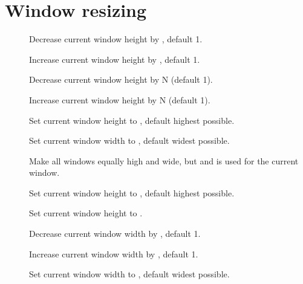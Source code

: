\section{Window resizing}
\begin{description}
  \item[] Decrease current window height by , default 1.
  \item[] Increase current window height by , default 1.
  \item[] Decrease current window height by N (default 1).
  \item[] Increase current window height by N (default 1).
  \item[] Set current window height to , default highest possible.
  \item[] Set current window width to , default widest possible.
  \item[] Make all windows equally high and wide, but  and  is used for the current window.
  \item[] Set current window height to , default highest possible.
  \item[] Set current window height to .
  \item[] Decrease current window width by , default 1.
  \item[] Increase current window width by , default 1.
  \item[] Set current window width to , default widest possible.
\end{description}
